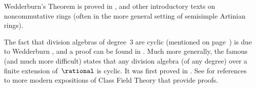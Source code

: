 \begin{notes}
Wedderburn's Theorem  is proved in 
\cite[Thm.~3.5, p.~49]{Pierce-AssocAlgs},
 and other introductory texts on noncommutative rings (often in the more general setting of semisimple Artinian rings).

The fact that division algebras of degree~$3$ are cyclic (mentioned on page~\pageref{CubicAlgIsCyclic}) is due to Wedderburn \cite{Wedderburn-OnDivAlgs}, and a proof can be found in \cite[Thm.~2.9.17, p.~69]{Jacobson-FDDivAlgs}.
Much more generally, the famous (and much more difficult)  states that any division algebra (of any degree) over a finite extension of~$\rational$ is cyclic. It was first proved in \cite{AlbertHasee-AlgsOverNumFld,BrauerHasseNoether-Hauptsatzes}.
See \cite[proof of Thm.~32.20, p.~280]{Reiner-MaximalOrders} for references to more modern expositions of Class Field Theory that provide proofs.

\end{notes}




